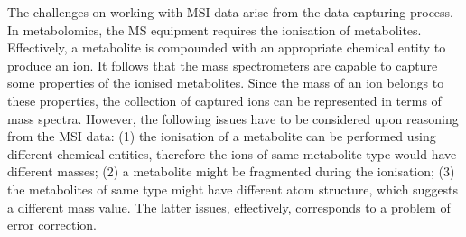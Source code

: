 \documentclass{mprop}
\begin{document}
\par The challenges on working with MSI data arise from the data capturing process. In metabolomics, the MS equipment requires the ionisation of metabolites. Effectively, a metabolite is compounded with an appropriate chemical entity to produce an ion. It follows that the mass spectrometers are capable to capture some properties of the ionised metabolites. Since the mass of an ion belongs to these properties, the collection of captured ions can be represented in terms of mass spectra. However, the following issues have to be considered upon reasoning from the MSI data: (1) the ionisation of a metabolite can be performed using different chemical entities, therefore the ions of same metabolite type would have different masses; (2) a metabolite might be fragmented during the ionisation; (3) the metabolites of same type might have different atom structure, which suggests a different mass value. The latter issues, effectively, corresponds to a problem of error correction.
 

\end{document}
